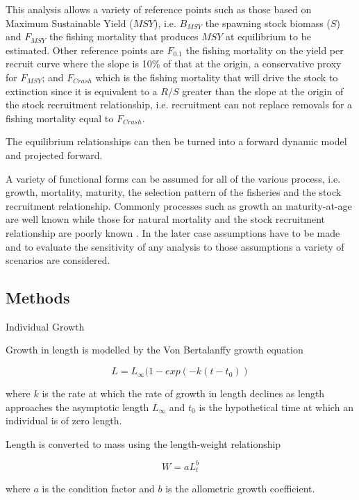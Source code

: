 \documentclass[preprint,12pt]{elsarticle}
\begin{document}
This analysis allows a variety of reference points such as those based on Maximum Sustainable Yield ($MSY$), i.e. $B_{MSY}$ the spawning stock biomass ($S$) and $F_{MSY}$ the fishing mortality that produces $MSY$ at equilibrium to be estimated. Other reference points are $F_{0.1}$ the fishing mortality on the yield per recruit curve where the slope is 10\% of that at the origin, a conservative proxy for $F_{MSY}$; and
$F_{Crash}$ which is the fishing mortality that will drive the stock to extinction since it is equivalent to a $R/S$ greater than the slope at the origin of the stock recruitment relationship, i.e. recruitment can not replace removals for a fishing mortality equal to $F_{Crash}$.  

The equilibrium relationships can then be turned into a forward dynamic model and projected forward.

A variety of functional forms can be assumed for all of the various process, i.e. growth, mortality, maturity, the selection pattern of the fisheries and the stock recruitment relationship. Commonly processes such as growth an maturity-at-age are well known while those for natural mortality and the stock recruitment relationship are poorly known \cite{michielsens2004bayesian}. In the later case assumptions have to be made and to evaluate the sensitivity of any analysis to those assumptions a variety of scenarios are considered. 

\subsection{Methods}

Individual Growth

Growth in length is modelled by the Von Bertalanffy growth equation \cite{vonbert1957quantitative}

\begin{equation} L = L_\infty(1 - exp(-k(t-t_0)) \end{equation}
         
where $k$ is the rate at which the rate of growth in length declines as length approaches the asymptotic length  $L_\infty$ and $t_{0}$ is the hypothetical time at which an individual is of zero length.

Length is converted to mass using the length-weight relationship 
    
\begin{equation} W = aL_t^b \end{equation}

\noindent where $a$ is the condition factor and $b$ is the allometric growth coefficient.
\end{document}
